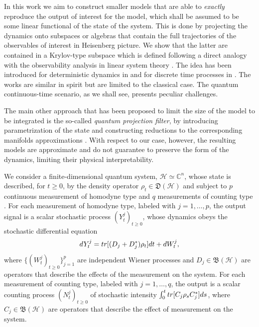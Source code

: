 \documentclass[aihp,12pt]{imsart}
\newcommand{\Hc}{\mathcal{H}}
\newcommand{\Cb}{\mathbb{C}}
\newcommand{\Bf}{\mathfrak{B}}
\newcommand{\Df}{\mathfrak{D}}
\newcommand{\tr}{{\rm tr}}
\theoremstyle{theorem}
\theoremstyle{definition}
\theoremstyle{remark}
\begin{document}
\vspace{3mm} In this work we aim to construct smaller models that are able to {\em exactly} reproduce the output of interest for the model, which shall be assumed to be some linear functional of the state of the system. This is done by projecting the dynamics onto subspaces or algebras that contain the full trajectories of the observables of interest in Heisenberg picture. We show that the latter are contained in a Krylov-type subspace \cite{kry31} which is defined following a direct analogy with the observability analysis in linear system theory \cite{kalman1969topics}. The idea has been introduced for deterministic dynamics in \cite{tit2023,prxq2024} and for discrete time processes in \cite{letter2024}. The works \cite{legoll2010effective,hartman2020} are similar in spirit but are limited to the classical case. The quantum continuous-time scenario, as we shall see, presents peculiar challenges.

The main other approach that has been proposed to limit the size of the model to be integrated is the so-called {\em quantum projection filter}, by introducing parametrization of the state and constructing reductions to the corresponding manifolds approximations \cite{ramadan_exact_2023, nurdin_structures_2014, gao_design_2020, gao_improved_2020, handel_quantum_2005, gao_exponential_2018}. With respect to our case, however, the resulting models are approximate and do not guarantee to preserve the form of the dynamics, limiting their physical interpretability.

\vspace{3mm}{\em System and measurements:} We consider a finite-dimensional quantum system, \(\Hc\simeq\Cb^n\), whose state is described, for $t\geq0$, by the density operator $\rho_t\in\Df(\Hc)$ and subject to $p$ continuous measurement of homodyne type \cite{barchielli2009quantum} and $q$ measurements of counting type \cite{barchielli1991measurements11}.
For each measurement of homodyne type, labeled with $j=1,\dots,p$, the output signal is a scalar stochastic process $(Y_t^j)_{t\geq0}$, whose dynamics obeys the stochastic differential equation 
\begin{equation}\label{eq:output}
    dY_t^j = \tr[(D_j+D_j^*)\rho_t]dt + dW_{t}^j,
\end{equation}
where $\{(W_t^j)_{t\geq0}\}_{j=1}^p$ are independent Wiener processes and $D_j\in\Bf(\Hc)$ are operators that describe the effects of the measurement on the system. 
For each measurement of counting type, labeled with $j=1,\dots,q$, the output is a scalar counting process $(N_t^j)_{t\geq0}$ of stochastic intensity \(\int_{0}^t \tr[C_j\rho_{s} C_j^*]ds\), where $C_j\in\Bf(\Hc)$ are operators that describe the effect of measurement on the system. 
\bigskip
\end{document}
